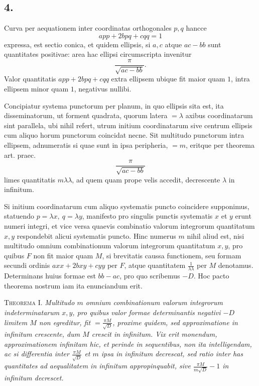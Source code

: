 \documentclass[12pt]{article}
\begin{document}
\subsection*{4.}

Curva per aequationem inter coordinatas orthogonales $p,q$ hancce
\[
app+2bpq+cqq=1
\]
expressa, est sectio conica, et quidem ellipsis, si $a,c$ atque $ac-bb$ sunt quantitates positivae: area hac ellipsi circumscripta invenitur
\[
\frac{\pi}{\sqrt{ac-bb}}.
\]
Valor quantitatis $app+2bpq+cqq$ extra ellipsem ubique fit maior quam $1$, intra ellipsem minor quam $1$, negativus nullibi.

Concipiatur systema punctorum per planum, in quo ellipsis sita est, ita disseminatorum, ut forment quadrata, quorum latera $=\lambda$ axibus coordinatarum sint parallela, ubi nihil refert, utrum initium coordinatarum sive centrum ellipsis cum aliquo horum punctorum coincidat necne. Sit multitudo punctorum intra ellipsem, adnumeratis si quae sunt in ipsa peripheria, $=m$, eritque per theorema art. praec.
\[
\frac{\pi}{\sqrt{ac-bb}}
\]
limes quantitatis $m\lambda\lambda$, ad quem quam prope velis accedit, decrescente $\lambda$ in infinitum.

Si initium coordinatarum cum aliquo systematis puncto coincidere supponimus, statuendo $p=\lambda x,\ q=\lambda y$, manifesto pro singulis punctis systematis $x$ et $y$ erunt numeri integri, et vice versa quaevis combinatio valorum integrorum quantitatum $x,y$ respondebit alicui systematis puncto. Hinc numerus $m$ nihil aliud est, nisi multitudo omnium combinationum valorum integrorum quantitatum $x,y$, pro quibus $F$ non fit maior quam $M$, si brevitatis caussa functionem, seu formam secundi ordinis $axx+2bxy+cyy$ per $F$, atque quantitatem $\frac{1}{\lambda\lambda}$ per $M$ denotamus. Determinans huius formae est $bb-ac$, pro quo scribemus $-D$. Hoc pacto theorema nostrum iam ita enunciandum erit.

\textsc{Theorema I.} \emph{Multitudo $m$ omnium combinationum valorum integrorum indeterminatarum $x,y$, pro quibus valor formae determinantis negativi $-D$ limitem $M$ non egreditur, fit $=\frac{\pi M}{\sqrt D}$, proxime quidem, sed approximatione in infinitum crescente, dum $M$ crescit in infinitum. Vix erit monendum, approximationem infinitam hic, et perinde in sequentibus, non ita intelligendam, ac si differentia inter $\frac{\pi M}{\sqrt D}$ et $m$ ipsa in infinitum decrescat, sed ratio inter has quantitates ad aequalitatem in infinitum appropinquabit, sive $\frac{\pi M}{m\sqrt D}-1$ in infinitum decrescet.}
\end{document}
